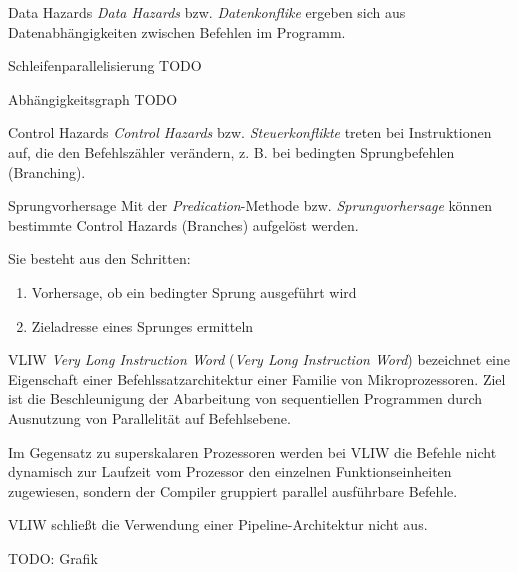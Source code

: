 \begin{defi}{Data Hazards}
    \emph{Data Hazards} bzw. \emph{Datenkonflike} ergeben sich aus Datenabhängigkeiten zwischen Befehlen im Programm.
\end{defi}

\begin{defi}{Schleifenparallelisierung}
    TODO
\end{defi}

\begin{defi}{Abhängigkeitsgraph}
    TODO
\end{defi}

\begin{defi}{Control Hazards}
    \emph{Control Hazards} bzw. \emph{Steuerkonflikte} treten bei Instruktionen auf, die den Befehlszähler verändern, z. B. bei bedingten Sprungbefehlen (Branching).
\end{defi}

\begin{defi}{Sprungvorhersage}
    Mit der \emph{Predication}-Methode bzw. \emph{Sprungvorhersage} können bestimmte Control Hazards (Branches) aufgelöst werden.
    
    Sie besteht aus den Schritten:
    \begin{enumerate}
        \item Vorhersage, ob ein bedingter Sprung ausgeführt wird
        \item Zieladresse eines Sprunges ermitteln
    \end{enumerate}
\end{defi}

\begin{defi}[Befehlssatzarchitektur]{VLIW}
    \emph{Very Long Instruction Word} (\emph{Very Long Instruction Word}) bezeichnet eine Eigenschaft einer Befehlssatzarchitektur einer Familie von Mikroprozessoren.
    Ziel ist die Beschleunigung der Abarbeitung von sequentiellen Programmen durch Ausnutzung von Parallelität auf Befehlsebene.
    
    Im Gegensatz zu superskalaren Prozessoren werden bei VLIW die Befehle nicht dynamisch zur Laufzeit vom Prozessor den einzelnen Funktionseinheiten zugewiesen, sondern der Compiler gruppiert parallel ausführbare Befehle.
    
    VLIW schließt die Verwendung einer Pipeline-Architektur nicht aus.
    
    TODO: Grafik
\end{defi}

